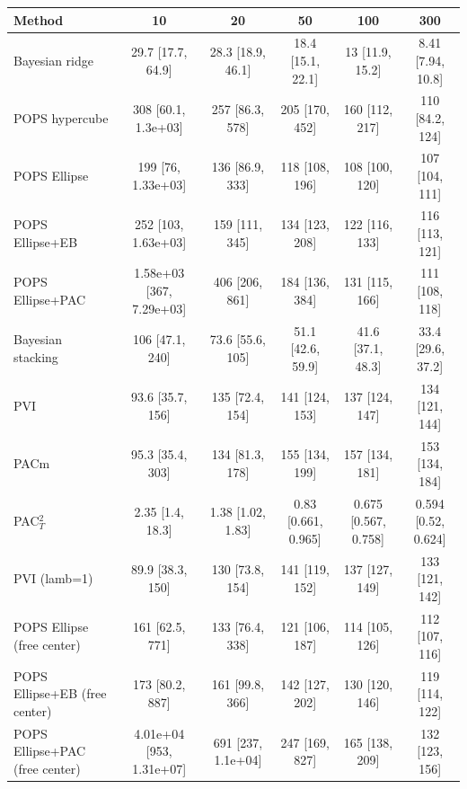 \begin{tabular}{lccccc}
\toprule
Method & 10 & 20 & 50 & 100 & 300 \\
\midrule
Bayesian ridge & 29.7 {\scriptsize[17.7, 64.9]} & 28.3 {\scriptsize[18.9, 46.1]} & 18.4 {\scriptsize[15.1, 22.1]} & 13 {\scriptsize[11.9, 15.2]} & 8.41 {\scriptsize[7.94, 10.8]} \\
POPS hypercube & 308 {\scriptsize[60.1, 1.3e+03]} & 257 {\scriptsize[86.3, 578]} & 205 {\scriptsize[170, 452]} & 160 {\scriptsize[112, 217]} & 110 {\scriptsize[84.2, 124]} \\
POPS Ellipse & 199 {\scriptsize[76, 1.33e+03]} & 136 {\scriptsize[86.9, 333]} & 118 {\scriptsize[108, 196]} & 108 {\scriptsize[100, 120]} & 107 {\scriptsize[104, 111]} \\
POPS Ellipse+EB & 252 {\scriptsize[103, 1.63e+03]} & 159 {\scriptsize[111, 345]} & 134 {\scriptsize[123, 208]} & 122 {\scriptsize[116, 133]} & 116 {\scriptsize[113, 121]} \\
POPS Ellipse+PAC & 1.58e+03 {\scriptsize[367, 7.29e+03]} & 406 {\scriptsize[206, 861]} & 184 {\scriptsize[136, 384]} & 131 {\scriptsize[115, 166]} & 111 {\scriptsize[108, 118]} \\
Bayesian stacking & 106 {\scriptsize[47.1, 240]} & 73.6 {\scriptsize[55.6, 105]} & 51.1 {\scriptsize[42.6, 59.9]} & 41.6 {\scriptsize[37.1, 48.3]} & 33.4 {\scriptsize[29.6, 37.2]} \\
PVI & 93.6 {\scriptsize[35.7, 156]} & 135 {\scriptsize[72.4, 154]} & 141 {\scriptsize[124, 153]} & 137 {\scriptsize[124, 147]} & 134 {\scriptsize[121, 144]} \\
PACm & 95.3 {\scriptsize[35.4, 303]} & 134 {\scriptsize[81.3, 178]} & 155 {\scriptsize[134, 199]} & 157 {\scriptsize[134, 181]} & 153 {\scriptsize[134, 184]} \\
PAC$^2_T$ & 2.35 {\scriptsize[1.4, 18.3]} & 1.38 {\scriptsize[1.02, 1.83]} & 0.83 {\scriptsize[0.661, 0.965]} & 0.675 {\scriptsize[0.567, 0.758]} & 0.594 {\scriptsize[0.52, 0.624]} \\
PVI (lamb=1) & 89.9 {\scriptsize[38.3, 150]} & 130 {\scriptsize[73.8, 154]} & 141 {\scriptsize[119, 152]} & 137 {\scriptsize[127, 149]} & 133 {\scriptsize[121, 142]} \\
POPS Ellipse (free center) & 161 {\scriptsize[62.5, 771]} & 133 {\scriptsize[76.4, 338]} & 121 {\scriptsize[106, 187]} & 114 {\scriptsize[105, 126]} & 112 {\scriptsize[107, 116]} \\
POPS Ellipse+EB (free center) & 173 {\scriptsize[80.2, 887]} & 161 {\scriptsize[99.8, 366]} & 142 {\scriptsize[127, 202]} & 130 {\scriptsize[120, 146]} & 119 {\scriptsize[114, 122]} \\
POPS Ellipse+PAC (free center) & 4.01e+04 {\scriptsize[953, 1.31e+07]} & 691 {\scriptsize[237, 1.1e+04]} & 247 {\scriptsize[169, 827]} & 165 {\scriptsize[138, 209]} & 132 {\scriptsize[123, 156]} \\
\bottomrule
\end{tabular}


